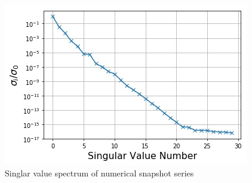 \documentclass{style/nseJournal}
\newcommand{\LFI}[1]{\label{fi:#1}}
\newcommand{\bfg}{\begin{figure}}
\newcommand{\efg}{\end{figure}}
\begin{document}
\bfg[h] \centering
	\includegraphics[scale=0.5]{figures/NSE19-11Fig02.jpg}
	\caption{Singlar value spectrum of numerical snapshot series}
	\LFI{sv-spec}
\efg
\end{document}

